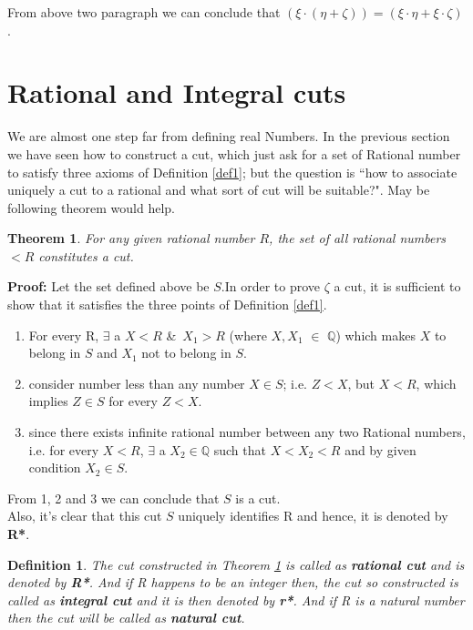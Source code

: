 \documentclass[12pt,a4paper,final,titlepage]{article}
\newtheorem{dfn}{Definition}
\newtheorem{thm}{Theorem}
\begin{document}
From above two paragraph we can conclude that $(\xi\cdot (\eta+\zeta)) = (\xi\cdot \eta + \xi\cdot \zeta)$.

\bigskip
\bigskip
\bigskip

\section{Rational and Integral cuts}
We are almost one step far from defining real Numbers. In the previous section we have seen how to construct a cut, which just ask for a set of Rational number to satisfy three axioms of Definition \ref{def1}; but the question is ``how to associate uniquely a cut to a rational and what sort of cut will be suitable?". May be following theorem would help.
\begin{thm} \label{thm10}
For any given rational number $R$, the set of all rational numbers $<R$ constitutes a cut.
\end{thm}
\textbf{Proof:} Let the set defined above be $S$.In order to prove $\zeta$ a cut, it is sufficient to show that it satisfies the three points of Definition \ref{def1}.
\begin{enumerate}
\item For every R, $\exists$ a $X<R$ \&\ $X_1>R$ (where $X,X_1$ $\in$ $\mathbb{Q}$) which makes $X$ to belong in $S$ and $X_1$ not to belong in $S$.
\item consider number less than any number $X\in S$; i.e. $Z<X$, but $X<R$, which implies $Z\in S$ for every $Z<X$.
\item since there exists infinite rational number between any two Rational numbers, i.e. for every $X<R$, $\exists$ a $X_2\in \mathbb{Q}$ such that $X<X_2<R$ and by given condition $X_2\in S$.
\end{enumerate}
From 1, 2 and 3 we can conclude that $S$ is a cut. \\
Also, it's clear that this cut $S$ uniquely identifies R and hence, it is denoted by \textbf{R*}.

\bigskip

\begin{dfn} \label{def7}
The cut constructed in Theorem \ref{thm10} is called as \textbf{rational cut} and is denoted by \textbf{R*}. And if R happens to be an integer then, the cut so constructed is called as \textbf{integral cut} and it is then denoted by \textbf{r*}. And if R is a natural number then the cut will be called as \textbf{natural cut}.
\end{dfn}
\end{document}
